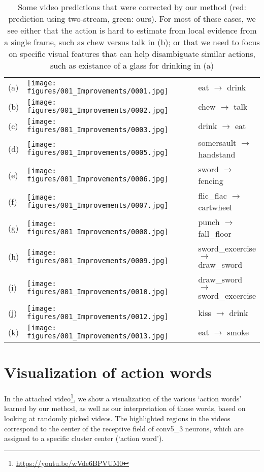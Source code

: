 \documentclass[10pt,twocolumn,letterpaper]{article}
\newcommand{\old}[1]{{\color{red} #1}}
\newcommand{\new}[1]{{\color{ao(english)} #1}}
\newcommand{\oldnew}[2]{\old{#1} $\rightarrow$ \new{#2}}
\begin{document}
\begin{table*}[]
\centering
\caption{Some video predictions that were corrected by our method (red: prediction using two-stream,
green: ours).
For most of these cases, we see either that the action is hard to estimate from local evidence
  from a single frame, such as chew versus talk in (b); or that we need to focus on
specific visual features that can help disambiguate similar actions, such as existance
  of a glass for drinking in (a)}
\label{fig:video_compare}
\begin{tabular}{m{0.005\linewidth}m{0.8\linewidth}m{0.195\linewidth}}
  (a) & \texttt{[image: figures/001\_Improvements/0001.jpg]} & \oldnew{eat}{drink} \\
  (b) & \texttt{[image: figures/001\_Improvements/0002.jpg]} & \oldnew{chew}{talk} \\
  (c) & \texttt{[image: figures/001\_Improvements/0003.jpg]} & \oldnew{drink}{eat} \\
	  (d) & \texttt{[image: figures/001\_Improvements/0005.jpg]} & \oldnew{somersault}{handstand} \\
  (e) & \texttt{[image: figures/001\_Improvements/0006.jpg]} & \oldnew{sword}{fencing} \\
  (f) & \texttt{[image: figures/001\_Improvements/0007.jpg]} & \oldnew{flic\_flac}{cartwheel} \\
  (g) & \texttt{[image: figures/001\_Improvements/0008.jpg]} & \oldnew{punch}{fall\_floor} \\
  (h) & \texttt{[image: figures/001\_Improvements/0009.jpg]} & \oldnew{sword\_excercise}{draw\_sword} \\
  (i) & \texttt{[image: figures/001\_Improvements/0010.jpg]} & \oldnew{draw\_sword}{sword\_excercise} \\
	  (j) & \texttt{[image: figures/001\_Improvements/0012.jpg]} & \oldnew{kiss}{drink} \\
  (k) & \texttt{[image: figures/001\_Improvements/0013.jpg]} & \oldnew{eat}{smoke} \\
\end{tabular}
\end{table*}


\section{Visualization of action words}
In the attached video\footnote{\url{https://youtu.be/wVde6BPVUM0}}, we show a visualization of the various `action words' learned by our method, as well as our interpretation of those words, based on looking at randomly picked videos.
The highlighted regions in the videos correspond to the center of the receptive
field of conv5\_3 neurons, which are assigned to a specific cluster center (`action word').
\end{document}
